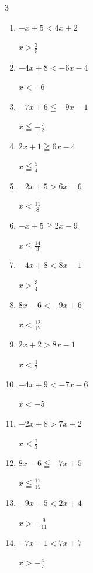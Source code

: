 \begin{multicols}{3}
\begin{enumerate}
  \item $-x+5<4x+2$

        $\displaystyle x>\frac{3}{5}$

  \item $-4x+8<-6x-4$

        $\displaystyle x<-6$

  \item $-7x+6\leqq -9x-1$

        $\displaystyle x\leqq -\frac{7}{2}$

\columnbreak %

\resetques

  \item $2x+1\geqq 6x-4$

        $\displaystyle x\leqq \frac{5}{4}$

  \item $-2x+5>6x-6$

        $\displaystyle x<\frac{11}{8}$

  \item $-x+5\geqq 2x-9$

        $\displaystyle x\leqq \frac{14}{3}$

  \item $-4x+8<8x-1$

        $\displaystyle x>\frac{3}{4}$

  \item $8x-6<-9x+6$

        $\displaystyle x<\frac{12}{17}$

  \item $2x+2>8x-1$

        $\displaystyle x<\frac{1}{2}$

  \item $-4x+9<-7x-6$

        $\displaystyle x<-5$

  \item $-2x+8>7x+2$

        $\displaystyle x<\frac{2}{3}$

  \item $8x-6\leqq -7x+5$

        $\displaystyle x\leqq \frac{11}{15}$

  \item $-9x-5<2x+4$

        $\displaystyle x>-\frac{9}{11}$

  \item $-7x-1<7x+7$

        $\displaystyle x>-\frac{4}{7}$


\end{enumerate}
\end{multicols}
